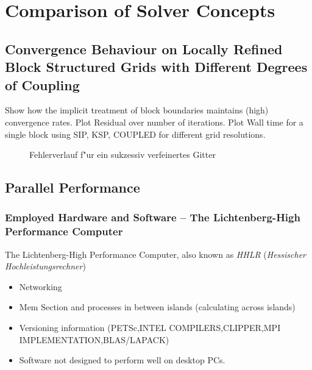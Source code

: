   \section{Comparison of Solver Concepts}
  
     \subsection{Convergence Behaviour on Locally Refined Block Structured Grids with Different Degrees of Coupling}

      Show how the implicit treatment of block boundaries maintains (high) convergence rates. Plot Residual over number of iterations. Plot Wall time for a single block using SIP, KSP, COUPLED for different grid resolutions.

\begin{figure} \centering
{}
\caption{Fehlerverlauf f"ur ein sukzessiv verfeinertes Gitter}
\label{fig:fehler}
\end{figure}


    \subsection{Parallel Performance}
      \subsubsection{Employed Hardware and Software -- The Lichtenberg-High Performance Computer }

        The Lichtenberg-High Performance Computer, also known as \emph{HHLR} (\emph{Hessischer Hochleistungsrechner})
        \begin{itemize}
          \item Networking
          \item Mem Section and processes in between islands (calculating across islands)
          \item Versioning information (PETSc,INTEL COMPILERS,CLIPPER,MPI IMPLEMENTATION,BLAS/LAPACK)
          \item Software not designed to perform well on desktop PCs.
        \end{itemize}

